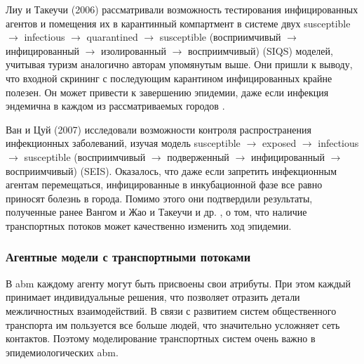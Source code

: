 \documentclass[a4paper,12pt]{article} %
\begin{document}
Лиу и Такеучи (2006) \cite{liu2006spread} рассматривали возможность тестирования инфицированных агентов и помещения их в карантинный компартмент в системе двух susceptible $\rightarrow$ infectious $\rightarrow$ quarantined $\rightarrow$ susceptible (восприимчивый $\rightarrow$ инфицированный $\rightarrow$ изолированный $\rightarrow$ восприимчивый) (SIQS) моделей, учитывая туризм аналогично авторам упомянутым выше. Они пришли к выводу, что входной скрининг с последующим карантином инфицированных крайне полезен. Он может привести к завершению эпидемии, даже если инфекция эндемична в каждом из рассматриваемых городов \cite{liu2006spread}.

Ван и Цуй (2007) \cite{wan2007seis} исследовали возможности контроля распространения инфекционных заболеваний, изучая модель susceptible $\rightarrow$ exposed $\rightarrow$ infectious $\rightarrow$ susceptible (восприимчивый $\rightarrow$ подверженный $\rightarrow$ инфицированный $\rightarrow$ восприимчивый) (SEIS). Оказалось, что даже если запретить инфекционным агентам перемещаться, инфицированные в инкубационной фазе все равно приносят болезнь в города.                                                                                                                                                                                                                                                                                                                          Помимо этого они подтвердили результаты, полученные ранее Вангом и Жао \cite{wang2004epidemic} и Такеучи и др. \cite{takeuchi2006spreading}, о том, что наличие транспортных потоков может качественно изменить ход эпидемии.


\subsubsection{Агентные модели с транспортными потоками}
В \gls{abm} каждому агенту могут быть присвоены свои атрибуты. При этом каждый принимает индивидуальные решения, что позволяет отразить детали межличностных взаимодействий. В связи с развитием систем общественного транспорта им пользуется все больше людей, что значительно усложняет сеть контактов. Поэтому моделирование транспортных систем очень важно в эпидемиологических \gls{abm}.
\end{document}

